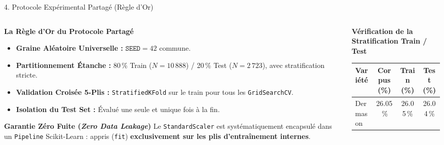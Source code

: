 \documentclass[aspectratio=169,10pt]{beamer}
\begin{document}
\begin{frame}{4. Protocole Expérimental Partagé (Règle d'Or)}
    \begin{columns}[T]
        \begin{column}{0.52\textwidth}
            \begin{block}{\textbf{La Règle d'Or du Protocole Partagé}}
                \small
                \begin{itemize}
                    \item \textbf{Graine Aléatoire Universelle :} $\texttt{SEED} = 42$ commune.
                    \item \textbf{Partitionnement Étanche :} 80\,\% Train ($N=10\,888$) / 20\,\% Test ($N=2\,723$), avec stratification stricte.
                    \item \textbf{Validation Croisée 5-Plis :} \texttt{StratifiedKFold} sur le train pour tous les \texttt{GridSearchCV}.
                    \item \textbf{Isolation du Test Set :} Évalué une seule et unique fois à la fin.
                \end{itemize}
            \end{block}
            \vspace{0.15cm}
            \begin{alertblock}{\textbf{Garantie Zéro Fuite (\textit{Zero Data Leakage})}}
                \footnotesize Le \texttt{StandardScaler} est systématiquement encapsulé dans un \texttt{Pipeline} Scikit-Learn : appris (\texttt{fit}) \textbf{exclusivement sur les plis d'entraînement internes}.
            \end{alertblock}
        \end{column}
        \begin{column}{0.46\textwidth}
            \begin{block}{\textbf{Vérification de la Stratification Train / Test}}
                \centering
                \scriptsize
                \begin{tabular}{@{}lccc@{}}
                    \toprule
                    \textbf{Variété} & \textbf{Corpus (\%)} & \textbf{Train (\%)} & \textbf{Test (\%)} \\
                    \midrule
                    Dermason & 26.05\,\% & 26.05\,\% & 26.04\,\% \\

\end{tabular}
\end{block}
\end{column}
\end{columns}
\end{frame}
\end{document}
